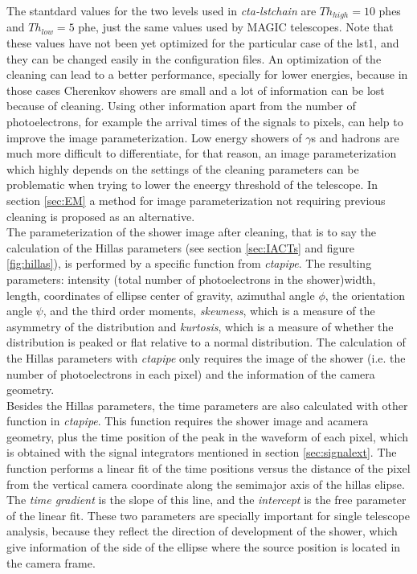 \documentclass[main.tex]{subfiles}
\begin{document}
   The stantdard values for the two levels used in \textit{cta-lstchain} are $Th_{high} = 10$ phes and $Th_{low} = 5$ phe, just the same values used by MAGIC telescopes. Note that these values have not been yet optimized for the particular case of the \gls{lst}1, and they can be changed easily in the configuration files. An optimization of the cleaning can lead to a better performance, specially for lower energies, because in those cases Cherenkov showers are small and a lot of information can be lost because of cleaning. Using other information apart from the number of photoelectrons, for example the arrival times of the signals to pixels, can help to improve the image parameterization. Low energy showers of $\gamma$s and hadrons are much more difficult to differentiate, for that reason, an image parameterization which highly depends on the settings of the cleaning parameters can be problematic when trying to lower the eneergy threshold of the telescope. In section \ref{sec:EM} a method for image parameterization not requiring previous cleaning is proposed as an alternative.\\
   The parameterization of the shower image after cleaning, that is to say the calculation of the Hillas parameters (see section \ref{sec:IACTs} and figure \ref{fig:hillas}), is performed by a specific function from \textit{ctapipe}. The resulting parameters: intensity (total number of photoelectrons in the shower)width, length, coordinates of ellipse center of gravity, azimuthal angle $\phi$, the orientation angle $\psi$, and the third order moments, \textit{skewness}, which is a measure of the asymmetry of the distribution and \textit{kurtosis}, which is a measure of whether the distribution is peaked or flat relative to a normal distribution. The calculation of the Hillas parameters with \textit{ctapipe} only requires the image of the shower (i.e. the number of photoelectrons in each pixel) and the information of the camera geometry.\\
   Besides the Hillas parameters, the time parameters are also calculated with other function in \textit{ctapipe}. This function requires the shower image and acamera geometry, plus the time position of the peak in the waveform of each pixel, which is obtained with the signal integrators mentioned in section \ref{sec:signalext}. The function performs a linear fit of the time positions versus the distance of the pixel from the vertical camera coordinate along the semimajor axis of the hillas elipse. The \textit{time gradient} is the slope of this line, and the \textit{intercept} is the free parameter of the linear fit. These two parameters are specially important for single telescope analysis, because they reflect the direction of development of the shower, which give information of the side of the ellipse where the source position is located in the camera frame.\\
\end{document}
